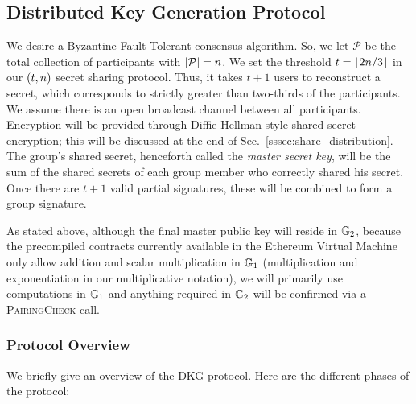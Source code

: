 \subsection{Distributed Key Generation Protocol}
\label{ssec:dkg}

We desire a Byzantine Fault Tolerant consensus algorithm.
So, we let $\mathcal{P}$ be the total collection of participants with
$\left| \mathcal{P} \right| = n$.
We set the threshold $t = \left\lfloor 2n/3 \right\rfloor$ in our $\left( t,n \right)$
secret sharing protocol.
Thus, it takes $t+1$ users to reconstruct a secret, which corresponds
to strictly greater than two-thirds of the participants.
We assume there is an open broadcast channel between all participants.
Encryption will be provided through Diffie-Hellman-style shared
secret encryption; this will be discussed at the end of
Sec.~\ref{sssec:share_distribution}.
The group's shared secret, henceforth called the \emph{master secret key},
will be the sum of the shared secrets of
each group member who correctly shared his secret.
Once there are $t+1$ valid partial signatures, these will be
combined to form a group signature.

As stated above, although the final master public key will
reside in $\mathbb{G}_{2}$, because the precompiled contracts
currently available in the Ethereum Virtual Machine only allow addition
and scalar multiplication in $\mathbb{G}_{1}$ (multiplication and exponentiation
in our multiplicative notation), we will primarily
use computations in $\mathbb{G}_{1}$ and anything required
in $\mathbb{G}_{2}$ will be confirmed via a \textsc{PairingCheck} call.

\subsubsection*{Protocol Overview}

We briefly give an overview of the DKG protocol.
Here are the different phases of the protocol:

